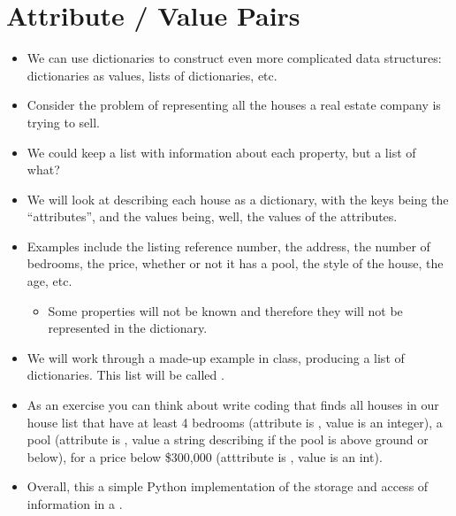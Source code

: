 \documentclass[letterpaper,10pt,english]{sphinxmanual}
\begin{document}
\section{Attribute / Value Pairs}
\label{\detokenize{lecture_notes/lec17_dictionaries2:attribute-value-pairs}}\begin{itemize}
\item {} 
We can use dictionaries to construct even more complicated data
structures: dictionaries as values, lists of dictionaries, etc.

\item {} 
Consider the problem of representing all the houses a real estate
company is trying to sell.

\item {} 
We could keep a list with information about each property, but a list
of what?

\item {} 
We will look at describing each house as a dictionary, with the keys
being the “attributes”, and the values being, well, the values of the
attributes.

\item {} 
Examples include the listing reference number, the address, the
number of bedrooms, the price, whether or not it has a pool, the
style of the house, the age, etc.
\begin{itemize}
\item {} 
Some properties will not be known and therefore they will not be
represented in the dictionary.

\end{itemize}

\item {} 
We will work through a made-up example in class, producing a list of
dictionaries. This list will be called .

\item {} 
As an exercise you can think about write coding that finds all
houses in our house list that have at least 4 bedrooms (attribute
is , value is an integer), a pool (attribute is
, value a string describing if the pool is above ground or
below), for a price below \$300,000 (atttribute is , value
is an int).

\item {} 
Overall, this a simple Python implementation of the storage and
access of information in a .

\end{itemize}
\end{document}
